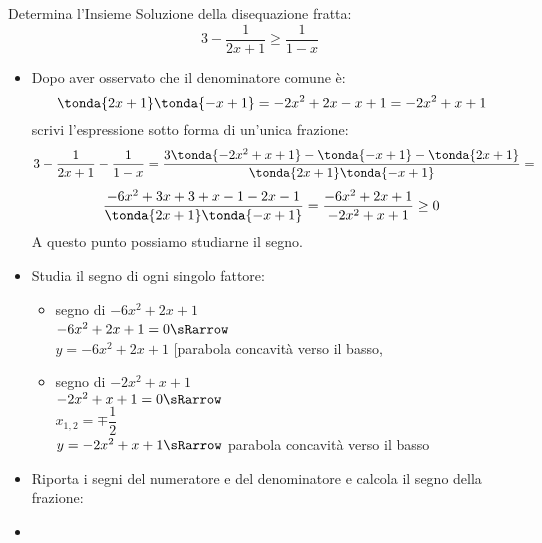 \begin{esempio}
Determina l'Insieme Soluzione della disequazione fratta:
\[3-\dfrac{1}{2x+1} \ge \dfrac{1}{1-x}\]

\begin{itemize}

\item Dopo aver osservato che il denominatore comune è:
\[\tonda{2x+1}\tonda{-x+1} = -2x^2 +2x -x +1 = -2x^2 +x +1\]
scrivi l'espressione sotto forma di un'unica frazione:
\[3-\dfrac{1}{2x+1} - \dfrac{1}{1-x} =
  \dfrac{3 \tonda{-2x^2 +x +1} - \tonda{-x+1} - \tonda{2x+1}}
        {\tonda{2x+1}\tonda{-x+1}} =\]
\[\dfrac{-6x^2 +3x +3 +x-1 -2x-1}
        {\tonda{2x+1}\tonda{-x+1}} = 
  \dfrac{-6x^2 +2x +1}
        {-2x^2 +x +1} \ge 0\]
A questo punto possiamo studiarne il segno.

 \item Studia il segno di ogni singolo fattore:

\begin{itemize}

 \item  segno di \(-6x^2 +2x +1\)\\
 \segnofatt
   {\(-6x^2 +2x +1=0 \sRarrow\)}
   {\\ \(y=-6x^2 +2x +1\)}
   {[parabola concavità verso il basso, }
   {}
 \item segno di \(-2x^2 +x +1\)\\
 \segnofatt
   {\(-2x^2 +x +1=0 \sRarrow \) \\
  \(x_{1,2}=\mp\dfrac{1}{2}\)}
   {\\ \(y=-2x^2 +x +1 \sRarrow\)}
   {parabola concavità verso il basso}
   {\parabolaamidma{}{}}
\end{itemize}

 \item Riporta i segni del numeratore e del denominatore e calcola
il segno della frazione:

\begin{inaccessibleblock}
\vspace{2em}
  \begin{center}
  \segnofrazionec
  \end{center}
\end{inaccessibleblock}

 \item 
 \insiemesoluzione
   {}
   {}
   {}
\end{itemize}
\end{esempio}

